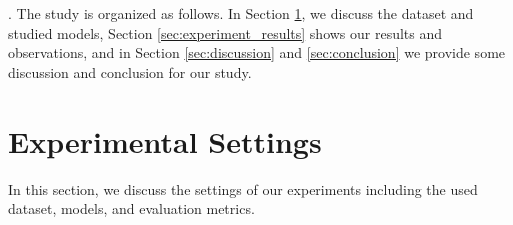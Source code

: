 . The study is organized as follows. In Section \ref{sec:experiment_scenarios}, we discuss the dataset and studied models, Section \ref{sec:experiment_results} shows our results and observations, and in Section \ref{sec:discussion} and \ref{sec:conclusion} we provide some discussion and conclusion for our study. 






\section{Experimental Settings} \label{sec:experiment_scenarios}
In this section, we discuss the settings of our experiments including the used dataset, models, and evaluation metrics.  


\begin{table}[h]
\centering
\caption{The parameters of selected models.}
\label{tab:model_info}
\end{table}
